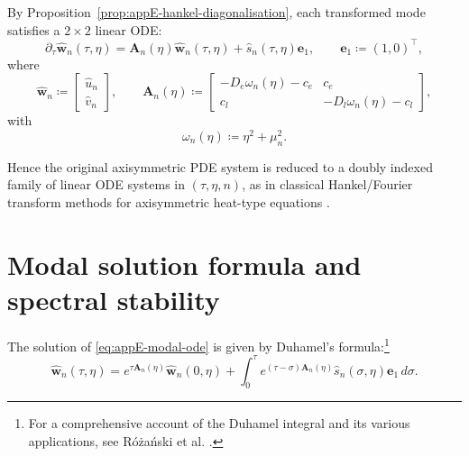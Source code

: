 By Proposition~\ref{prop:appE-hankel-diagonalisation},
each transformed mode satisfies a \(2\times 2\) linear ODE:
\begin{equation}
    \partial_\tau
    \widehat{\mathbf{w}}_n(\tau,\eta)
    =
    \mathbf{A}_n(\eta)\widehat{\mathbf{w}}_n(\tau,\eta)
    +
    \widehat{s}_n(\tau,\eta)\mathbf{e}_1,
    \qquad
    \mathbf{e}_1\coloneqq (1,0)^\top,
    \label{eq:appE-modal-ode}
\end{equation}
where
\begin{equation}
    \widehat{\mathbf{w}}_n
    \coloneqq
    \begin{bmatrix}
        \widehat{u}_n \\[2pt]
        \widehat{v}_n
    \end{bmatrix},
    \qquad
    \mathbf{A}_n(\eta)
    \coloneqq
    \begin{bmatrix}
        -D_e\omega_n(\eta)-c_e & c_e                    \\
        c_l                    & -D_l\omega_n(\eta)-c_l
    \end{bmatrix},
    \label{eq:appE-modal-matrix}
\end{equation}
with
\begin{equation}
    \omega_n(\eta)\coloneqq \eta^2+\mu_n^2.
    \label{eq:appE-omega-def}
\end{equation}

Hence the original axisymmetric PDE system is reduced to a doubly indexed
family of linear ODE systems in \((\tau,\eta,n)\), as in classical
Hankel/Fourier transform methods for axisymmetric heat-type equations
\cite{Davies_2002_Hankel,Rogers_2012,Kunga_2021}.

\section{Modal solution formula and spectral stability}
\label{sec:appE-modal-solution}

The solution of \eqref{eq:appE-modal-ode} is given by Duhamel's formula:\footnote{For a comprehensive account of the Duhamel integral and its various applications, see R{\'o}{\.z}a{\'n}ski et al. \cite{Różański_2021}.}
\begin{equation}
    \widehat{\mathbf{w}}_n(\tau,\eta)
    =
    e^{\tau \mathbf{A}_n(\eta)}
    \widehat{\mathbf{w}}_n(0,\eta)
    +
    \int_0^\tau
    e^{(\tau-\sigma)\mathbf{A}_n(\eta)}
    \widehat{s}_n(\sigma,\eta)\mathbf{e}_1\, d\sigma.
    \label{eq:appE-duhamel}
\end{equation}

